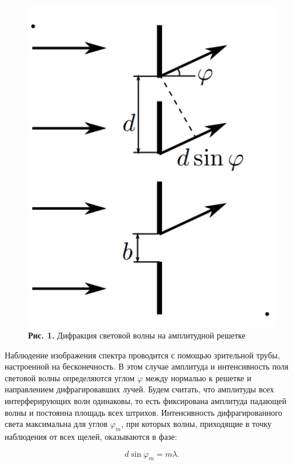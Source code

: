 \documentclass[a4paper,12pt]{article} %
\begin{document}
\begin{figure}
\begin{center}
    \includegraphics[width=1\textwidth]{4.4.1_1.png}
    \textbf{Рис. 1.} Дифракция световой волны на амплитудной решетке
\end{center}
\end{figure}

\hfill \break Наблюдение изображения спектра проводится с помощью зрительной трубы, настроенной на бесконечность. В этом случае амплитуда и интенсивность поля световой волны определяются углом $\varphi$ между нормалью к решетке и направлением дифрагировавших лучей. Будем считать, что амплитуды всех интерферирующих волн одинаковы, то есть фиксирована амплитуда падающей волны и постоянна площадь всех штрихов. Интенсивность дифрагированного света максимальна для углов $\varphi_{m}$, при которых волны, приходящие в точку наблюдения от всех щелей, оказываются в фазе:

\begin{equation}\label{ linkname }
d\sin{\varphi}_{m} = m\lambda.
\end{equation}
\end{document}

